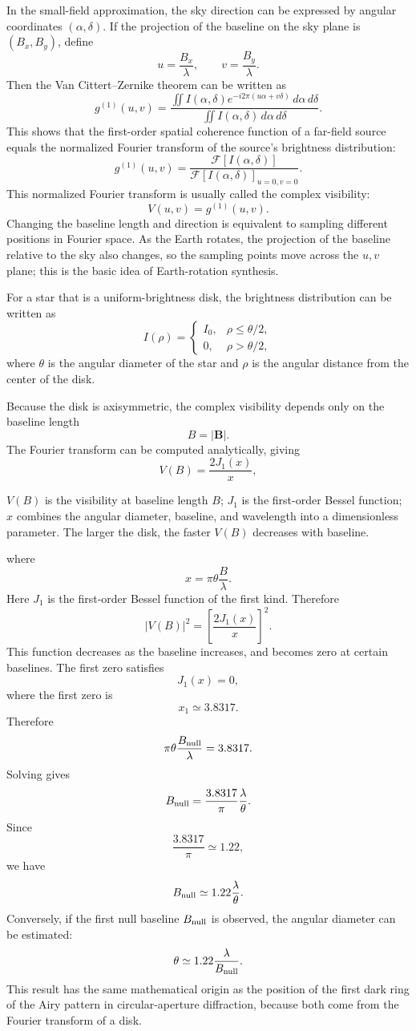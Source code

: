 In the small-field approximation, the sky direction can be expressed by angular coordinates \((\alpha,\delta)\). If the projection of the baseline on the sky plane is \((B_x,B_y)\), define
\[
  u=\frac{B_x}{\lambda},
  \qquad
  v=\frac{B_y}{\lambda}.
\]
Then the Van Cittert--Zernike theorem can be written as
\[
  g^{(1)}(u,v)
  =
  \frac{
    \iint
    I(\alpha,\delta)
    e^{-i2\pi(u\alpha+v\delta)}
    \,d\alpha\,d\delta
  }{
    \iint
    I(\alpha,\delta)
    \,d\alpha\,d\delta
  }.
\]
This shows that the first-order spatial coherence function of a far-field source equals the normalized Fourier transform of the source's brightness distribution:
\[
  g^{(1)}(u,v)
  =
  \frac{
    \mathcal F[I(\alpha,\delta)]
  }{
    \mathcal F[I(\alpha,\delta)]_{u=0,v=0}
  }.
\]
This normalized Fourier transform is usually called the complex visibility:
\[
  V(u,v)=g^{(1)}(u,v).
\]
Changing the baseline length and direction is equivalent to sampling different positions in Fourier space. As the Earth rotates, the projection of the baseline relative to the sky also changes, so the sampling points move across the \(u,v\) plane; this is the basic idea of Earth-rotation synthesis.

For a star that is a uniform-brightness disk, the brightness distribution can be written as
\[
  I(\rho)=
  \begin{cases}
    I_0, & \rho\leq \theta/2,\\
    0, & \rho>\theta/2,
  \end{cases}
\]
where \(\theta\) is the angular diameter of the star and \(\rho\) is the angular distance from the center of the disk.

Because the disk is axisymmetric, the complex visibility depends only on the baseline length
\[
  B=|\mathbf B|.
\]
The Fourier transform can be computed analytically, giving
\[
  V(B)
  =
  \frac{2J_1(x)}{x},
\]
\begin{formulaexplain}
\(V(B)\) is the visibility at baseline length \(B\); \(J_1\) is the first-order Bessel function; \(x\) combines the angular diameter, baseline, and wavelength into a dimensionless parameter. The larger the disk, the faster \(V(B)\) decreases with baseline.
\end{formulaexplain}
where
\[
  x=
  \pi\theta\frac{B}{\lambda}.
\]
Here \(J_1\) is the first-order Bessel function of the first kind. Therefore
\[
  |V(B)|^2
  =
  \left[
  \frac{2J_1(x)}{x}
  \right]^2.
\]
This function decreases as the baseline increases, and becomes zero at certain baselines. The first zero satisfies
\[
  J_1(x)=0,
\]
where the first zero is
\[
  x_1\simeq 3.8317.
\]
Therefore
\[
  \pi\theta\frac{B_{\rm null}}{\lambda}
  =
  3.8317.
\]
Solving gives
\[
  B_{\rm null}
  =
  \frac{3.8317}{\pi}
  \frac{\lambda}{\theta}.
\]
Since
\[
  \frac{3.8317}{\pi}\simeq 1.22,
\]
we have
\[
  B_{\rm null}
  \simeq
  1.22\frac{\lambda}{\theta}.
\]
Conversely, if the first null baseline \(B_{\rm null}\) is observed, the angular diameter can be estimated:
\[
  \theta
  \simeq
  1.22\frac{\lambda}{B_{\rm null}}.
\]
This result has the same mathematical origin as the position of the first dark ring of the Airy pattern in circular-aperture diffraction, because both come from the Fourier transform of a disk.

